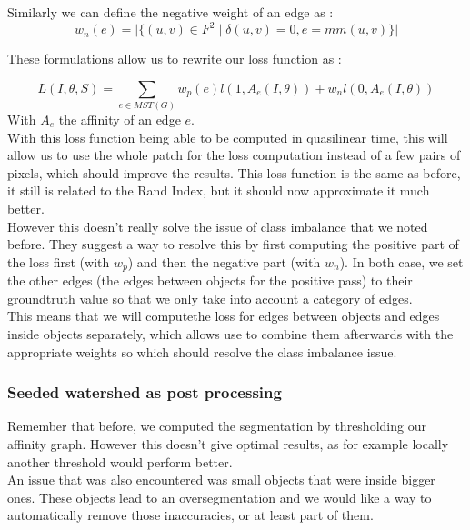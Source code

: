 Similarly we can define the negative weight of an edge as :
\begin{equation*}
	w_n(e)=\lvert \{(u,v)\in F^2 \;|\;\delta(u,v)=0, e=mm(u,v) \}   \rvert
\end{equation*}

These formulations allow us to rewrite our loss function as :

\begin{equation*}
	L(I,\theta,S) = \sum_{e\in MST(G)} w_p(e)l(1,A_e(I,\theta)) + w_nl(0,A_e(I,\theta))
\end{equation*}
With $A_e$ the affinity of an edge $e$.\\

With this loss function being able to be computed in quasilinear time, this
will allow us to use the whole patch for the loss computation instead of a few
pairs of pixels, which should improve the results. This loss function is the
same as before, it still is related to the Rand Index, but it should now
approximate it much better.\\


However this doesn't really solve the issue of class imbalance that we noted
before. They suggest a way to resolve this by first computing the positive part
of the loss first (with $w_p$) and then the negative part (with $w_n$). In both
case, we set the other edges (the edges between objects for the positive pass)
to their groundtruth value so that we only take into account a category of
edges.\\
This means that we will computethe loss for edges between objects and edges
inside objects separately, which allows use to combine them afterwards with the
appropriate weights so which should resolve the class imbalance issue.

\subsubsection{Seeded watershed as post processing}

Remember that before, we computed the segmentation by thresholding our affinity
graph. However this doesn't give optimal results, as for example locally
another threshold would perform better.\\
An issue that was also encountered was small objects that were inside bigger
ones. These objects lead to an oversegmentation and we would like a way to
automatically remove those inaccuracies, or at least part of them.

